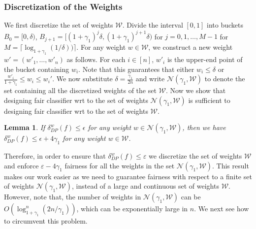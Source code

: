 \documentclass{article}
\newtheorem{lemma}{Lemma}
\newcommand{\ceil}[1]{\lceil #1 \rceil}
\newcommand{\WW}{\mathcal{W}}
\newcommand{\Nc}{\mathcal{N}}
\newcommand{\eps}{\varepsilon}
\begin{document}
\subsubsection{Discretization of the Weights}
We first discretize the set of weights $\WW$. Divide the interval $[0,1]$ into buckets $B_0 = [0,\delta)$, $B_{j+1} = [(1+\gamma_1)^j \delta, (1+\gamma_1)^{j+1}\delta)$ for $j=0,1,\ldots,M-1$ for $M = \ceil{\log_{1+\gamma_1}(1/\delta) )}$. For any weight $w\in \WW$, we construct a new weight $w' = (w'_1,\ldots,w'_n)$ as follows. For each $i \in [n]$, $w'_i$ is the upper-end point of the bucket containing $w_i$. Note that this guarantees that either $w_i\le \delta$ or $\frac{w'_i}{1+\gamma_1} \le w_i \le w_i'$. We now substitute $\delta = \frac{\gamma_1}{2n}$ and write $\Nc(\gamma_1,\WW)$ to denote the set containing all the discretized weights of the set $\WW$.  Now we show that designing fair classifier wrt to the set of weights $\Nc(\gamma_1,\WW)$ is sufficient to designing fair classifier wrt to the set of weights $\WW$. 
\begin{lemma}\label{lem:discrete-weights}
If $\delta^w_{DP}(f) \le \epsilon$ for any weight $w \in \Nc(\gamma_1,\WW)$, then we have $\delta^w_{DP}(f) \le \epsilon + 4\gamma_1$ for any weight $w \in \WW$.
\end{lemma}
 Therefore, in order to ensure that $\delta^w_{DP}(f) \le \eps$ we discretize the set of weights $\WW$ and enforce $\eps-4\gamma_1$ fairness for all the weights in the set $\Nc(\gamma_1,\WW)$. This result makes our work easier as we need to guarantee fairness with respect to a finite set of weights $\Nc(\gamma_1,\WW)$, instead of a large and continuous set of weights $\WW$. However, note that, the number of weights in $\Nc(\gamma_1,\WW)$ can be $O\left( \log^n_{1+\gamma_1}(2n/\gamma_1)\right)$, which can be exponentially large in $n$. We next see how to circumvent this problem.
\end{document}
